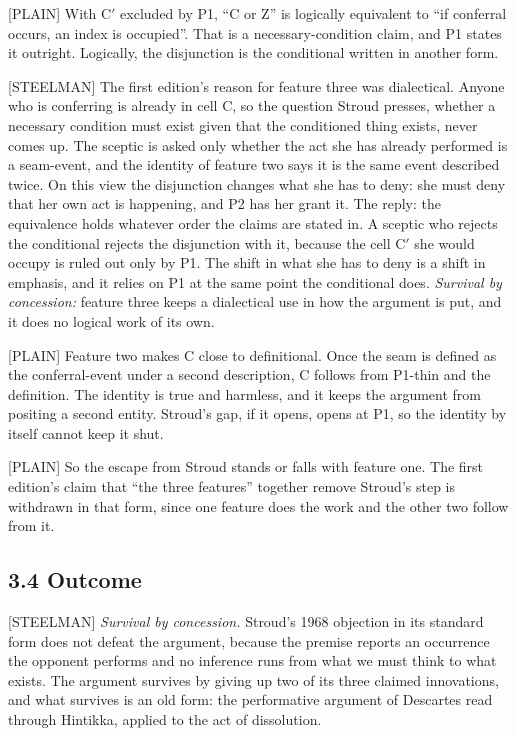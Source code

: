 \documentclass[11pt]{article}
\newcommand{\register}[1]{{\ttfamily\small #1}}
\begin{document}
\register{[PLAIN]} With C\ensuremath{'} excluded by P1, ``C or Z'' is logically equivalent to ``if conferral occurs, an index is occupied''. That is a necessary-condition claim, and P1 states it outright. Logically, the disjunction is the conditional written in another form.

\register{[STEELMAN]} The first edition's reason for feature three was dialectical. Anyone who is conferring is already in cell C, so the question Stroud presses, whether a necessary condition must exist given that the conditioned thing exists, never comes up. The sceptic is asked only whether the act she has already performed is a seam-event, and the identity of feature two says it is the same event described twice. On this view the disjunction changes what she has to deny: she must deny that her own act is happening, and P2 has her grant it. The reply: the equivalence holds whatever order the claims are stated in. A sceptic who rejects the conditional rejects the disjunction with it, because the cell C\ensuremath{'} she would occupy is ruled out only by P1. The shift in what she has to deny is a shift in emphasis, and it relies on P1 at the same point the conditional does. \emph{Survival by concession:} feature three keeps a dialectical use in how the argument is put, and it does no logical work of its own.

\register{[PLAIN]} Feature two makes C close to definitional. Once the seam is defined as the conferral-event under a second description, C follows from P1-thin and the definition. The identity is true and harmless, and it keeps the argument from positing a second entity. Stroud's gap, if it opens, opens at P1, so the identity by itself cannot keep it shut.

\register{[PLAIN]} So the escape from Stroud stands or falls with feature one. The first edition's claim that ``the three features'' together remove Stroud's step is withdrawn in that form, since one feature does the work and the other two follow from it.

\subsection*{3.4 Outcome}

\register{[STEELMAN]} \emph{Survival by concession.} Stroud's 1968 objection in its standard form does not defeat the argument, because the premise reports an occurrence the opponent performs and no inference runs from what we must think to what exists. The argument survives by giving up two of its three claimed innovations, and what survives is an old form: the performative argument of Descartes read through Hintikka, applied to the act of dissolution.
\end{document}
